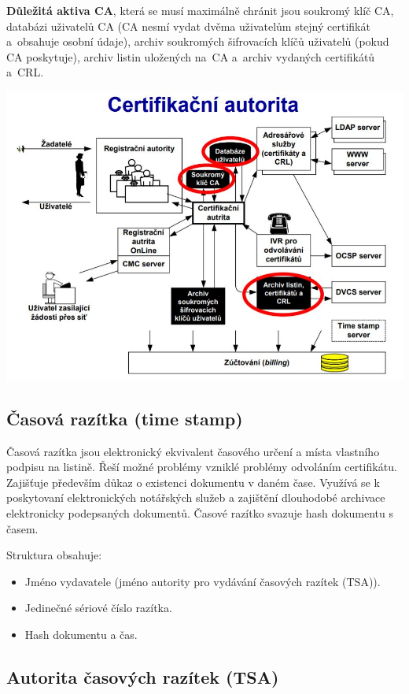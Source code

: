 \textbf{Důležitá aktiva CA}, která se musí maximálně chránit jsou soukromý klíč CA, databázi uživatelů CA (CA nesmí vydat dvěma uživatelům stejný certifikát a~obsahuje osobní údaje), archiv soukromých šifrovacích klíčů uživatelů (pokud CA poskytuje), archiv listin uložených na~CA a~archiv vydaných certifikátů a~CRL.
\begin{center}
\includegraphics[scale=0.5]{images/CA.jpg}
\end{center}

\subsection{Časová razítka (time stamp)}

Časová razítka jsou elektronický ekvivalent časového určení a místa vlastního podpisu na listině. Řeší možné problémy vzniklé problémy odvoláním certifikátu. Zajišťuje především důkaz o existenci dokumentu v daném čase. Využívá se k poskytovaní elektronických notářských služeb a zajištění dlouhodobé archivace elektronicky podepsaných dokumentů. Časové razítko svazuje hash dokumentu s časem.

\noindent Struktura obsahuje:
\begin{itemize}[noitemsep]
    \item Jméno vydavatele (jméno autority pro vydávání časových razítek (TSA)).
    \item Jedinečné sériové číslo razítka.
    \item Hash dokumentu a čas.
\end{itemize}

\subsection{Autorita časových razítek (TSA)}

